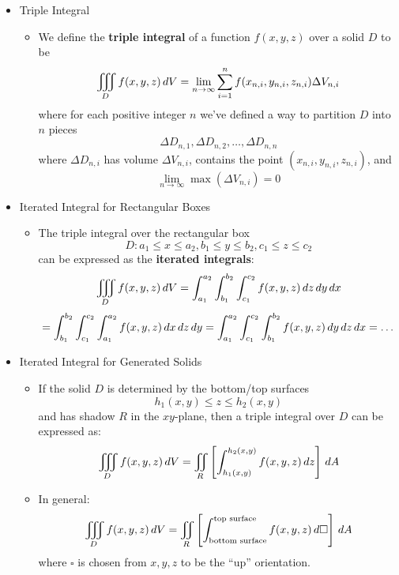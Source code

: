   \begin{itemize}

  \item Triple Integral
    \begin{itemize}
    \item We define the \textbf{triple integral} of a function $f(x,y,z)$ over a solid $D$ to be 
        \[
          \iiint_D f(x,y,z)\,d{V} = \lim_{n\to\infty}\sum_{i=1}^n f(x_{n,i},y_{n,i},z_{n,i})\Delta V_{n,i}
        \]
      where for each positive integer $n$ we've defined a way to partition $D$ into $n$ pieces 
        \[
          \Delta D_{n,1},\Delta D_{n,2},\dots,\Delta D_{n,n}
        \]
      where $\Delta D_{n,i}$ has volume $\Delta V_{n,i}$, contains the point $(x_{n,i},y_{n,i},z_{n,i})$, and \[\lim_{n\to\infty} \max(\Delta V_{n,i}) = 0\]
    \end{itemize}

  \item Iterated Integral for Rectangular Boxes
    \begin{itemize}
      \item The triple integral over the rectangular box
        \[
          D: a_1\leq x\leq a_2, b_1\leq y\leq b_2, c_1\leq z\leq c_2
        \]
        can be expressed as the \textbf{iterated integrals}:
      \[
        \iiint_D f(x,y,z)\,d{V} = \int_{a_1}^{a_2}\int_{b_1}^{b_2}\int_{c_1}^{c_2} f(x,y,z)\,d{z}\,d{y}\,d{x}
      \]
      \[
        = \int_{b_1}^{b_2}\int_{c_1}^{c_2}\int_{a_1}^{a_2} f(x,y,z)\,d{x}\,d{z}\,d{y} 
        = \int_{a_1}^{a_2}\int_{c_1}^{c_2}\int_{b_1}^{b_2} f(x,y,z)\,d{y}\,d{z}\,d{x} 
        = \dots
      \]
    \end{itemize}

  \item Iterated Integral for Generated Solids
    \begin{itemize}
      \item If the solid $D$ is determined by the bottom/top surfaces
        \[
          h_1(x,y)\leq z\leq h_2(x,y)
        \]
      and has shadow $R$ in the $xy$-plane, then a triple integral over $D$ can be expressed as:
        \[
          \iiint_D f(x,y,z)\,d{V} = \iint_R\left[ \int_{h_1(x,y)}^{h_2(x,y)} f(x,y,z) \,d{z}  \right]\,d{A}
        \]
      \item In general:
        \[
          \iiint_D f(x,y,z)\,d{V} = \iint_R\left[ \int_{\text{bottom surface}}^{\text{top surface}} f(x,y,z) \,d{\square}  \right]\,d{A}
        \]
      where $\square$ is chosen from $x,y,z$ to be the ``up'' orientation.
    \end{itemize}


\end{itemize}
